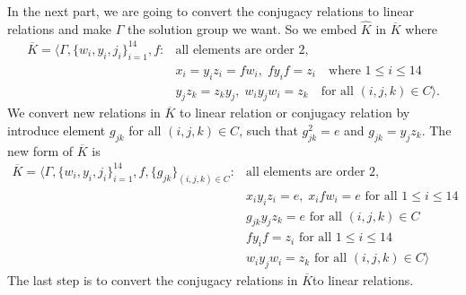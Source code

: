 \documentclass[11pt,letterpaper]{article}
\newcommand{\1}{\mathbb{1}}
\theoremstyle{definition}
\begin{document}
In the next part, we are going to convert the conjugacy relations to linear relations
and make $\Gamma$ the solution group we want.
So we embed $\hat{K}$ in $\overline{K}$ where 
\begin{align*}
	\overline{K} = \langle \Gamma, \{w_i, y_i, j_i\}_{i=1}^{14}, f:&\text{all elements are order $2$},\\
	&x_i = y_iz_i = fw_i,\; fy_if =z_i \quad\text{where } 1 \leq i \leq 14 \\
	&y_j z_k = z_ky_j,\; w_iy_jw_i = z_k \quad\text{for all } (i,j,k)\in C \rangle.
\end{align*}
We convert new relations in $\overline{K}$ to linear relation or conjugacy relation by introduce 
element $g_{jk}$ for all $(i,j,k) \in C$, such that $g_{jk}^2 = e$ and $g_{jk} = y_j z_k$.
The new form of $\overline{K}$ is 
\begin{equation}
\begin{split}
	\overline{K} = \langle \Gamma, \{w_i, y_i, j_i\}_{i=1}^{14}, f, \{g_{jk}\}_{(i,j,k) \in C} :&\text{all elements are order $2$},\\
	&x_iy_iz_i = e,\; x_ifw_i = e\text{ for all } 1 \leq i \leq 14\\
	&g_{jk} y_j z_k = e \text{ for all } (i,j,k) \in C\\
	&fy_if = z_i \text{ for all } 1 \leq i \leq 14 \\
	&w_iy_jw_i = z_k  \text{ for all } (i,j,k) \in C \rangle
\end{split}
\end{equation}
The last step is to convert the conjugacy relations in $\overline{K}$to linear relations.
\end{document}
